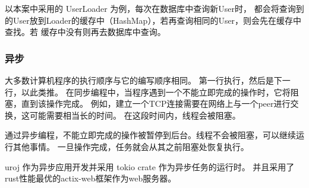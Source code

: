以本案中采用的 UserLoader 为例，每次在数据库中查询新User时，
都会将查询到的User放到Loader的缓存中（HashMap），若再查询相同的User，则会先在缓存中查找。若
缓存中没有则再去数据库中查询。

\subsubsection{异步}
大多数计算机程序的执行顺序与它的编写顺序相同。
第一行执行，然后是下一行，以此类推。
在同步编程中，当程序遇到一个不能立即完成的操作时，它将阻塞，直到该操作完成。
例如，建立一个TCP连接需要在网络上与一个peer进行交换，这可能需要相当长的时间。
在这段时间内，线程会被阻塞。

通过异步编程，不能立即完成的操作被暂停到后台。线程不会被阻塞，可以继续运行其他事情。
一旦操作完成，任务就会从其之前阻塞处恢复执行。

uroj 作为异步应用开发并采用 tokio crate 作为异步任务的运行时。
并且采用了rust性能最优的actix-web框架作为web服务器。